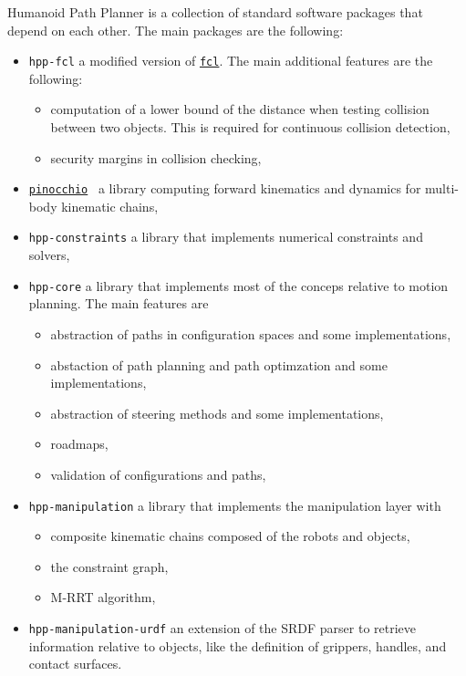 Humanoid Path Planner is a collection of standard software packages that depend
on each other. The main packages are the following:
\begin{itemize}
\item \texttt{hpp-fcl} a modified version of \href{https://github.com/flexible-collision-library/fcl}{\texttt{fcl}}. The main additional features are the following:
  \begin{itemize}
  \item computation of a lower bound of the distance when testing collision
    between two objects. This is required for continuous collision detection,
  \item security margins in collision checking,
  \end{itemize}
\item \href{https://stack-of-tasks.github.io/pinocchio}{\texttt{pinocchio}}~\cite{pinocchio} a library computing forward kinematics and dynamics for multi-body kinematic chains,
\item \texttt{hpp-constraints} a library that implements numerical constraints
  and solvers,
\item \texttt{hpp-core} a library that implements most of the conceps relative
  to motion planning. The main features are
  \begin{itemize}
  \item abstraction of paths in configuration spaces and some implementations,
  \item abstaction of path planning and path optimzation and some implementations,
  \item abstraction of steering methods and some implementations,
  \item roadmaps,
  \item validation of configurations and paths,
  \end{itemize}
\item \texttt{hpp-manipulation} a library that implements the manipulation
  layer with
  \begin{itemize}
    \item composite kinematic chains composed of the robots and objects,
    \item the constraint graph,
    \item M-RRT algorithm,
  \end{itemize}
\item \texttt{hpp-manipulation-urdf} an extension of the SRDF parser to retrieve
  information relative to objects, like the definition of grippers, handles, and
  contact surfaces.
\end{itemize}
